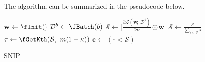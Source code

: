 The algorithm can be summarized in the pseudocode below.

\begin{algorithm}[!h]
\AlgoFontSize
\DontPrintSemicolon


\BlankLine
$\textbf{w} \gets \fInit()$\;
$\mathcal{D}^b \gets \fBatch(b)$ 
$\mathcal{S} \gets \Big|\frac{\partial \mathcal{L}(\textbf{w}; \ \mathcal{D}^b)}{\partial \textbf{w}} \odot \textbf{w}\Big|$ 
$\mathcal{S} \gets \frac{\mathcal{S}}{\sum_{s \in \mathcal{S}} s}$  
$\tau \gets \fGetKth(\mathcal{S}, \ m(1-\kappa))$ 
$\textbf{c} \gets (\tau < \mathcal{S})$ 


\caption{SNIP}
\label{SNIP:algo}
\end{algorithm}

